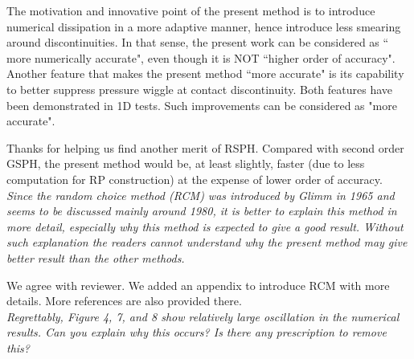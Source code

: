 \documentclass[10pt,a4paper]{article}
\begin{document}
The motivation and innovative point of the present method is to introduce numerical dissipation in a more adaptive manner, hence introduce less smearing around discontinuities. In that sense, the present work can be considered as `` more numerically accurate", even though it is NOT ``higher order of accuracy". Another feature that makes the present method  ``more accurate" is its capability to better suppress pressure wiggle at contact discontinuity. Both features have been demonstrated in 1D tests. Such improvements can be considered as "more accurate".
 
Thanks for helping us find another merit of RSPH. Compared with second order GSPH, the present method would be, at least slightly, faster (due to less computation for RP construction) at the expense of lower order of accuracy. \\[3pt] 

\textit{Since the random choice method (RCM) was introduced by Glimm in 1965 and seems to be discussed mainly around 1980, it is better to explain this method in more detail, especially why this method is expected to give a good result. Without such explanation the readers cannot understand why the present method may give better result than the other methods.}

We agree with reviewer. We added an appendix to introduce RCM with more details. More references are also provided there.\\[3pt]

\textit{Regrettably, Figure 4, 7, and 8 show relatively large oscillation in the
numerical results. Can you explain why this occurs? Is there any prescription to remove this?}
\end{document}
